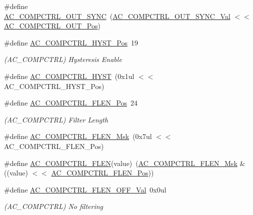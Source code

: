 \begin{DoxyCompactItemize}
\#define \mbox{\hyperlink{group___s_a_m_d21___a_c_ga73dd8696bf4218d77035cbe365edf0b2}{A\+C\+\_\+\+C\+O\+M\+P\+C\+T\+R\+L\+\_\+\+O\+U\+T\+\_\+\+S\+Y\+NC}}~(\mbox{\hyperlink{group___s_a_m_d21___a_c_ga85ea47206d4f4b7d3b3a59244ae48705}{A\+C\+\_\+\+C\+O\+M\+P\+C\+T\+R\+L\+\_\+\+O\+U\+T\+\_\+\+S\+Y\+N\+C\+\_\+\+Val}}      $<$$<$ \mbox{\hyperlink{group___s_a_m_d21___a_c_ga6dfe864873a0eadaba8922ecf4b25ed1}{A\+C\+\_\+\+C\+O\+M\+P\+C\+T\+R\+L\+\_\+\+O\+U\+T\+\_\+\+Pos}})
\item 
\#define \mbox{\hyperlink{group___s_a_m_d21___a_c_ga080eedbd8cdba82fc0d24013941b523b}{A\+C\+\_\+\+C\+O\+M\+P\+C\+T\+R\+L\+\_\+\+H\+Y\+S\+T\+\_\+\+Pos}}~19
\begin{DoxyCompactList}\small\item\em (A\+C\+\_\+\+C\+O\+M\+P\+C\+T\+RL) Hysteresis Enable \end{DoxyCompactList}\item 
\#define \mbox{\hyperlink{group___s_a_m_d21___a_c_ga8ca0d1a2d7f08614430677b854cef883}{A\+C\+\_\+\+C\+O\+M\+P\+C\+T\+R\+L\+\_\+\+H\+Y\+ST}}~(0x1ul $<$$<$ A\+C\+\_\+\+C\+O\+M\+P\+C\+T\+R\+L\+\_\+\+H\+Y\+S\+T\+\_\+\+Pos)
\item 
\#define \mbox{\hyperlink{group___s_a_m_d21___a_c_ga66181eff5fbbb90049f3aae3b27b5a62}{A\+C\+\_\+\+C\+O\+M\+P\+C\+T\+R\+L\+\_\+\+F\+L\+E\+N\+\_\+\+Pos}}~24
\begin{DoxyCompactList}\small\item\em (A\+C\+\_\+\+C\+O\+M\+P\+C\+T\+RL) Filter Length \end{DoxyCompactList}\item 
\#define \mbox{\hyperlink{group___s_a_m_d21___a_c_gac6722289f24273d120a620b6f8d2dca0}{A\+C\+\_\+\+C\+O\+M\+P\+C\+T\+R\+L\+\_\+\+F\+L\+E\+N\+\_\+\+Msk}}~(0x7ul $<$$<$ A\+C\+\_\+\+C\+O\+M\+P\+C\+T\+R\+L\+\_\+\+F\+L\+E\+N\+\_\+\+Pos)
\item 
\#define \mbox{\hyperlink{group___s_a_m_d21___a_c_ga9af296187c31a82f625033dd6799f6d7}{A\+C\+\_\+\+C\+O\+M\+P\+C\+T\+R\+L\+\_\+\+F\+L\+EN}}(value)~(\mbox{\hyperlink{group___s_a_m_d21___a_c_gac6722289f24273d120a620b6f8d2dca0}{A\+C\+\_\+\+C\+O\+M\+P\+C\+T\+R\+L\+\_\+\+F\+L\+E\+N\+\_\+\+Msk}} \& ((value) $<$$<$ \mbox{\hyperlink{group___s_a_m_d21___a_c_ga66181eff5fbbb90049f3aae3b27b5a62}{A\+C\+\_\+\+C\+O\+M\+P\+C\+T\+R\+L\+\_\+\+F\+L\+E\+N\+\_\+\+Pos}}))
\item 
\#define \mbox{\hyperlink{group___s_a_m_d21___a_c_ga724ff78f629c59a482f3318c76dca04e}{A\+C\+\_\+\+C\+O\+M\+P\+C\+T\+R\+L\+\_\+\+F\+L\+E\+N\+\_\+\+O\+F\+F\+\_\+\+Val}}~0x0ul
\begin{DoxyCompactList}\small\item\em (A\+C\+\_\+\+C\+O\+M\+P\+C\+T\+RL) No filtering \end{DoxyCompactList}\item 

\end{DoxyCompactItemize}
